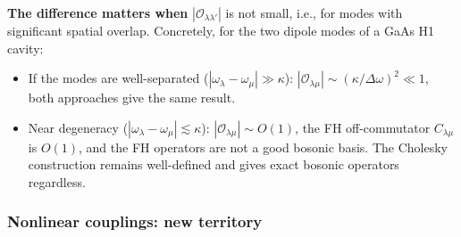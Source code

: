 \documentclass[12pt]{article}
\begin{document}
\textbf{The difference matters when} $|\mathcal{O}_{\lambda\lambda'}|$
is not small, i.e., for modes with significant spatial overlap.
Concretely, for the two dipole modes of a GaAs H1 cavity:
\begin{itemize}
  \item If the modes are well-separated ($|\omega_\lambda-\omega_\mu|\gg\kappa$):
    $|\mathcal{O}_{\lambda\mu}|\sim(\kappa/\Delta\omega)^2\ll 1$,
    both approaches give the same result.
  \item Near degeneracy ($|\omega_\lambda-\omega_\mu|\lesssim\kappa$):
    $|\mathcal{O}_{\lambda\mu}|\sim O(1)$, the FH off-commutator $C_{\lambda\mu}$
    is $O(1)$, and the FH operators are not a good bosonic basis.
    The Cholesky construction remains well-defined and gives exact bosonic
    operators regardless.
\end{itemize}

\subsubsection*{Nonlinear couplings: new territory}
\end{document}
